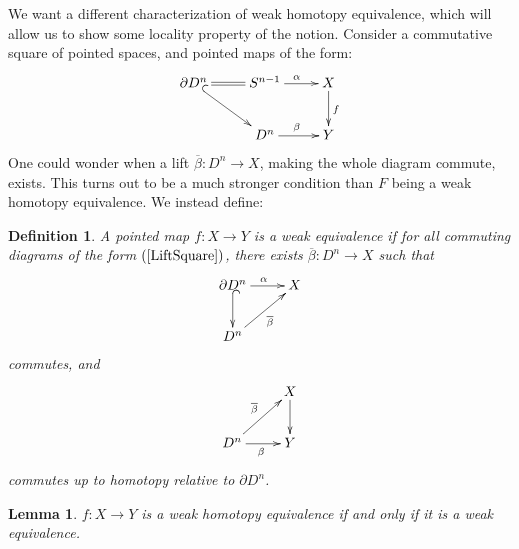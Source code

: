 \documentclass{article}
\newtheorem{lemma}[theorem]{Lemma}
\newtheorem{definition}[theorem]{Definition}
\newtheorem{proposed work}[theorem]{Proposed Work}
\theoremstyle{definition}
\newcommand{\xymat}[1]{\begin{align*}\xymatrix{ #1}\end{align*}}
\newcommand{\xymattal}[2]{\begin{align} \label{#1} \xymatrix{ #2}\end{align}}
\begin{document}
We want a different characterization of weak homotopy equivalence, which will allow us to show some locality property of the notion. Consider a commutative square of pointed spaces, and pointed maps of the form:  
\xymattal{LiftSquare}{\partial D^n \ar@{=}[r] \ar@{^{(}->}[dr]&S^{n-1} \ar[r]^\alpha  & X \ar[d]^f \\& D^n \ar[r]^\beta & Y}
One could wonder when a lift $\overline{\beta}: D^n \to X$, making the whole diagram commute, exists. This turns out to be a much stronger condition than $F$ being a weak homotopy equivalence. We instead define:
\begin{definition} \label{def:weak-equiv}
A pointed map $f:X\to Y$ is a weak equivalence if for all commuting diagrams of the form $(\ref{LiftSquare})$, there exists $\overline{\beta}:D^n\to X$ such that
\xymat{\partial D^n \ar[r]^\alpha \ar@{^{(}->}[d]& X \\ D^n \ar[ur]_{\overline{\beta}} &} commutes, and 
\xymat{& X \ar[d] \\ D^n \ar[ur]^{\overline{\beta}} \ar[r]_\beta & Y}
commutes up to homotopy relative to $\partial D^n$.
\end{definition}
\begin{lemma}
$f:X\to Y$ is a weak homotopy equivalence if and only if it is a weak equivalence.
\end{lemma}
\end{document}
